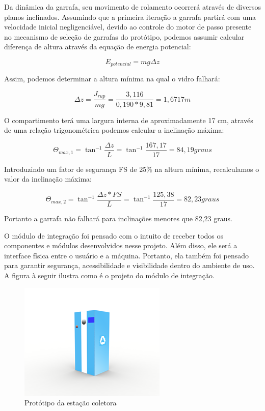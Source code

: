 Da dinâmica da garrafa, seu movimento de rolamento ocorrerá através de diversos planos inclinados. Assumindo que a primeira iteração a garrafa partirá com uma velocidade inicial negligenciável, devido ao controle do motor de passo presente no mecanismo de seleção de garrafas do protótipo, podemos assumir calcular diferença de altura através da equação de energia potencial:

\begin{equation}
    E_{potencial} = mg\Delta z
\end{equation}

Assim, podemos determinar a altura mínima na qual o vidro falhará:

\begin{equation}
    \Delta z = \frac{J_{rup}}{mg} = \frac{3,116}{0,190 \ast 9,81} = 1,6717 m
\end{equation}

O compartimento terá uma largura interna de aproximadamente 17 cm, através de uma relação trigonométrica podemos calcular a inclinação máxima:

\begin{equation}
    \Theta _{max,1} = \tan^{-1}\frac{\Delta z}{L} = \tan^{-1}\frac{167,17}{17} = 84,19 graus
\end{equation}

Introduzindo um fator de segurança FS de 25\% na altura mínima, recalculamos o valor da inclinação máxima:

\begin{equation}
    \Theta _{max,2} = \tan^{-1}\frac{\Delta z \ast FS}{L} = \tan^{-1}\frac{125,38}{17} = 82,23 graus
\end{equation}

Portanto a garrafa não falhará para inclinações menores que 82,23 graus.

O módulo de integração foi pensado com o intuito de receber todos os componentes e módulos desenvolvidos nesse projeto. Além disso, ele será a interface física entre o usuário e a máquina. Portanto, ela também foi pensado para garantir segurança, acessibilidade e visibilidade dentro do ambiente de uso. A figura à seguir ilustra como é o projeto do módulo de integração.

\begin{figure}[!h]
	\centering
		\includegraphics[scale=1.2]{figuras/estrutura/28.png}
	\caption{Protótipo da estação coletora}
\end{figure}

